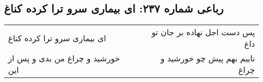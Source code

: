 \begin{center}
\section*{رباعی شماره ۲۳۷: ای بیماری سرو ترا کرده کناغ}
\label{sec:sh237}
\begin{longtable}{l p{0.5cm} r}
ای بیماری سرو ترا کرده کناغ
&&
پس دست اجل نهاده بر جان تو داغ
\\
خورشید و چراغ من بدی و پس از این
&&
ناییم بهم پیش چو خورشید و چراغ
\\
\end{longtable}
\end{center}
